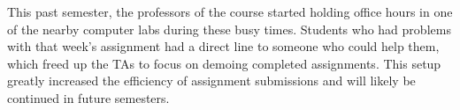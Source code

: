 This past semester, the professors of the course started holding office hours in
one of the nearby computer labs during these busy times. Students who had
problems with that week's assignment had a direct line to someone who could
help them, which freed up the TAs to focus on demoing completed assignments.
This setup greatly increased the efficiency of assignment submissions and will
likely be continued in future semesters.
